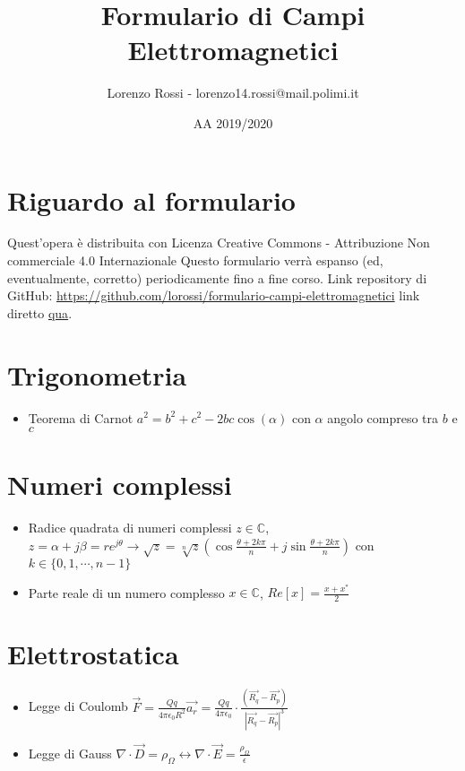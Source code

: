 \documentclass{article}
\title{Formulario di Campi Elettromagnetici}
\author{Lorenzo Rossi - lorenzo14.rossi@mail.polimi.it}
\date{AA 2019/2020}
\begin{document}
\maketitle

\section{Riguardo al formulario}
Quest'opera è distribuita con Licenza Creative Commons - Attribuzione Non commerciale 4.0 Internazionale \ccbynceu  \newline
Questo formulario verrà espanso (ed, eventualmente, corretto) periodicamente fino a fine corso.
Link repository di GitHub: \url{https://github.com/lorossi/formulario-campi-elettromagnetici} link diretto \href{https://github.com/lorossi/formulario-campi-elettromagnetici/blob/master/formule_campi.pdf}{qua}. \newline 

\section{Trigonometria}
\begin{itemize}
	\item Teorema di Carnot \( a^2 = b^2 + c^2 - 2bc\cos(\alpha)\) con \(\alpha\) angolo compreso tra \(b\) e \(c\) 
\end{itemize}

\section{Numeri complessi}
\begin{itemize}
	\item Radice quadrata di numeri complessi \(z \in \mathbb{C}\), \( z = \alpha + j \beta = r e^{j \theta} \rightarrow \sqrt{z} = \sqrt[n]{z} ( \cos{\frac{\theta + 2k\pi}{n}} + j \sin{\frac{\theta + 2 k \pi}{n}} ) \) \newline con \(k \in \{0, 1, \cdots, n-1 \} \)
	\item Parte reale di un numero complesso \(x \in \mathbb{C}\), \(Re[x] = \frac{x + x^{*}}{2} \)
\end{itemize}

\section{Elettrostatica}
\begin{itemize}
	\item Legge di Coulomb \( \vec{F} = \frac{Qq}{4 \pi \epsilon_0 R^2} \vec{a_r} = \frac{Qq}{4 \pi \epsilon_0} \cdot \frac{(\vec{R_q} - \vec{R_p})}{| \vec{R_q} - \vec{R_p} | ^3 } \)
	\item Legge di Gauss \( \nabla \cdot \vec{D} = \rho_\Omega \leftrightarrow \nabla \cdot \vec{E} = \frac{\rho_\Omega}{\epsilon} \)
\end{itemize}
\end{document}
